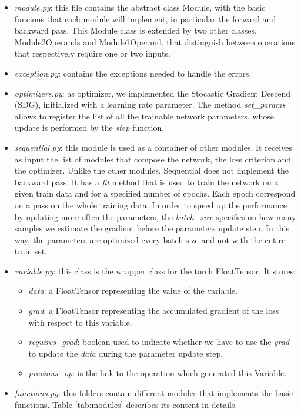 \documentclass[10pt,conference,compsocconf]{IEEEtran}
\begin{document}
\begin{itemize}
	\item \textit{module.py}: this file contains the abstract class Module, with the basic funcions that each module will implement, in particular the forward and backward pass. This Module class is extended by two other classes, Module2Operands and Module1Operand, that distinguish between operations that respectively require one or two inputs. 
	
	\item \textit{exception.py}: contains the exceptions needed to handle the errors.
	
	\item \textit{optimizers.py}: as optimizer, we implemented the Stocastic Gradient Descend (SDG), initialized with a learning rate parameter. The method \textit{set\_params} allows to register the list of all the trainable network parameters, whose update is performed by the \textit{step} function.
	
	\item \textit{sequential.py}: this module is used as a container of other modules. It receives as input the list of modules that compose the network, the loss criterion and the optimizer. Unlike the other modules, Sequential does not implement the backward pass. It has a \textit{fit} method that is used to train the network on a given train data and for a specified number of epochs. Each epoch correspond on a pass on the whole training data. In order to speed up the performance by updating more often the parameters, the \textit{batch\_size} specifies on how many samples we estimate the gradient before the parameters update step. In this way, the parameters are optimized every batch size and not with the entire train set.
	
	\item \textit{variable.py}: this class is the wrapper class for the torch FloatTensor. It stores:
	\begin{itemize}
        \item \textit{data}: a FloatTensor representing the value of the variable.
		\item \textit{grad}: a FloatTensor representing the accumulated gradient of the loss with respect to this variable.
		\item \textit{requires\_grad}: boolean used to indicate whether we have to use the \textit{grad} to update the \textit{data} during the parameter update step.
		\item \textit{previous\_op}: is the link to the operation which generated this Variable.
	\end{itemize}
	
	\item \textit{functions.py}: this folders contain different modules that implements the basic functions. Table \ref{tab:modules} describes its content in details.
\end{itemize}
\end{document}
